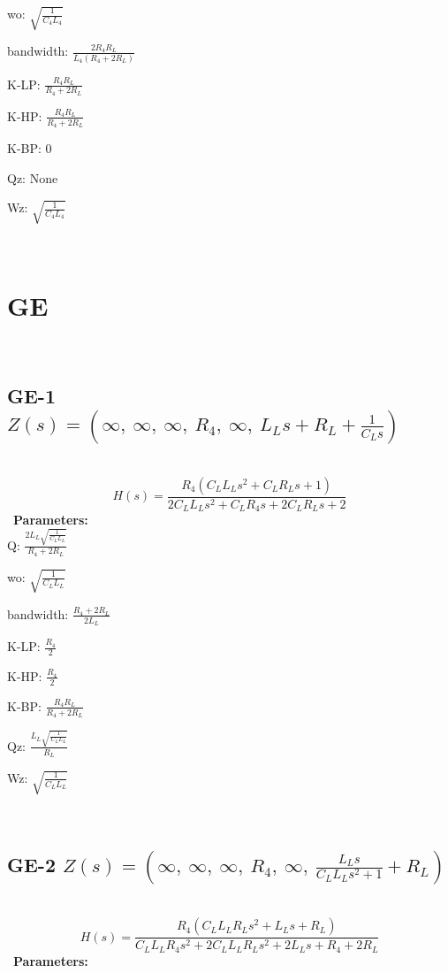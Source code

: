 \documentclass{article}
\begin{document}
wo: $\sqrt{\frac{1}{C_{4} L_{4}}}$\ 

bandwidth: $\frac{2 R_{4} R_{L}}{L_{4} \left(R_{4} + 2 R_{L}\right)}$\ 

K-LP: $\frac{R_{4} R_{L}}{R_{4} + 2 R_{L}}$\ 

K-HP: $\frac{R_{4} R_{L}}{R_{4} + 2 R_{L}}$\ 

K-BP: $0$\ 

Qz: $\text{None}$\ 

Wz: $\sqrt{\frac{1}{C_{4} L_{4}}}$\ 

\ 

\section{GE}\ 
\subsection{GE-1 $Z(s) = \left( \infty, \  \infty, \  \infty, \  R_{4}, \  \infty, \  L_{L} s + R_{L} + \frac{1}{C_{L} s}\right)$ } \ 
\textbf{\[H(s) = \frac{R_{4} \left(C_{L} L_{L} s^{2} + C_{L} R_{L} s + 1\right)}{2 C_{L} L_{L} s^{2} + C_{L} R_{4} s + 2 C_{L} R_{L} s + 2}\] } \ 
\textbf{Parameters:}\\ 

Q: $\frac{2 L_{L} \sqrt{\frac{1}{C_{L} L_{L}}}}{R_{4} + 2 R_{L}}$\ 

wo: $\sqrt{\frac{1}{C_{L} L_{L}}}$\ 

bandwidth: $\frac{R_{4} + 2 R_{L}}{2 L_{L}}$\ 

K-LP: $\frac{R_{4}}{2}$\ 

K-HP: $\frac{R_{4}}{2}$\ 

K-BP: $\frac{R_{4} R_{L}}{R_{4} + 2 R_{L}}$\ 

Qz: $\frac{L_{L} \sqrt{\frac{1}{C_{L} L_{L}}}}{R_{L}}$\ 

Wz: $\sqrt{\frac{1}{C_{L} L_{L}}}$\ 

\ 

\subsection{GE-2 $Z(s) = \left( \infty, \  \infty, \  \infty, \  R_{4}, \  \infty, \  \frac{L_{L} s}{C_{L} L_{L} s^{2} + 1} + R_{L}\right)$ } \ 
\textbf{\[H(s) = \frac{R_{4} \left(C_{L} L_{L} R_{L} s^{2} + L_{L} s + R_{L}\right)}{C_{L} L_{L} R_{4} s^{2} + 2 C_{L} L_{L} R_{L} s^{2} + 2 L_{L} s + R_{4} + 2 R_{L}}\] } \ 
\textbf{Parameters:}\\ 
\end{document}
